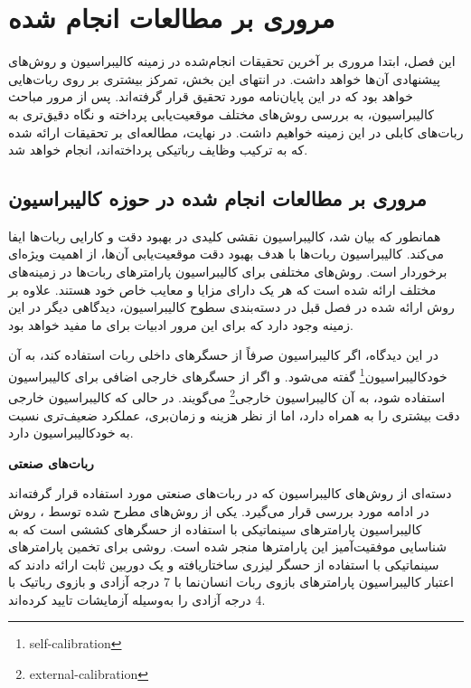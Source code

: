 \chapter{مروری بر مطالعات انجام شده}
این فصل، ابتدا مروری بر آخرین تحقیقات انجام‌شده در زمینه کالیبراسیون و روش‌های پیشنهادی آن‌ها خواهد داشت. در انتهای این بخش، تمرکز بیشتری بر روی ربات‌هایی خواهد بود که در این پایان‌نامه مورد تحقیق قرار گرفته‌اند. پس از مرور مباحث کالیبراسیون، به بررسی روش‌های مختلف موقعیت‌یابی پرداخته و نگاه دقیق‌تری به ربات‌های کابلی در این زمینه خواهیم داشت. در نهایت، مطالعه‌ای بر تحقیقات ارائه شده که به ترکیب وظایف رباتیکی پرداخته‌اند، انجام خواهد شد.

\section{مروری بر مطالعات انجام شده در حوزه کالیبراسیون} 



همانطور که بیان شد، کالیبراسیون نقشی کلیدی در بهبود دقت و کارایی ربات‌ها ایفا می‌کند. کالیبراسیون ربات‌ها با هدف بهبود دقت موقعیت‌یابی آن‌ها، از اهمیت ویژه‌ای برخوردار است. روش‌های مختلفی برای کالیبراسیون پارامترهای ربات‌ها در زمینه‌های مختلف ارائه شده است که هر یک دارای مزایا و معایب خاص خود هستند. علاوه بر روش ارائه شده در فصل قبل در دسته‌بندی سطوح کالیبراسیون، دیدگاهی دیگر در این زمینه وجود دارد که برای این مرور ادبیات برای ما مفید خواهد بود.

در این دیدگاه، اگر کالیبراسیون صرفاً از حسگرهای داخلی ربات استفاده کند، به آن خودکالیبراسیون\footnote{self-calibration} گفته می‌شود. و اگر از حسگر‌های خارجی اضافی برای کالیبراسیون استفاده شود، به آن کالیبراسیون خارجی\footnote{external-calibration} می‌گویند. در حالی که کالیبراسیون خارجی دقت بیشتری را به همراه دارد، اما از نظر هزینه و زمان‌بری، عملکرد ضعیف‌تری نسبت به خودکالیبراسیون دارد.



\textbf{ربات‌های صنعتی}

 دسته‌ای از روش‌های کالیبراسیون که در ربات‌های صنعتی مورد استفاده قرار گرفته‌اند در ادامه مورد بررسی قرار می‌گیرد. یکی از روش‌های مطرح شده توسط \cite{gan2019calibration}، روش کالیبراسیون پارامترهای سینماتیکی با استفاده از حسگرهای کششی است که به شناسایی موفقیت‌آمیز این پارامترها منجر شده است. \cite{park2011laser} روشی برای تخمین پارامترهای سینماتیکی با استفاده از حسگر لیزری ساختاریافته و یک دوربین ثابت ارائه دادند که اعتبار کالیبراسیون پارامترهای بازوی ربات انسان‌نما با 7 درجه آزادی و بازوی رباتیک با 4 درجه آزادی را به‌وسیله آزمایشات تایید کرده‌اند. 
 
